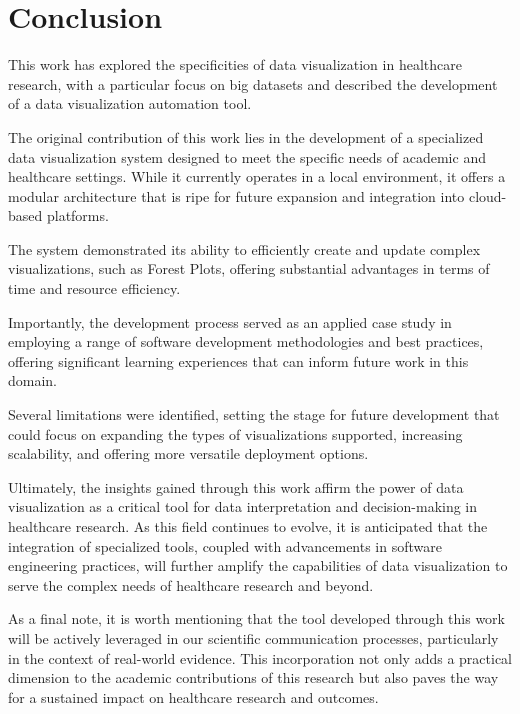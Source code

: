 \chapter{Conclusion}\label{conclusion}

This work has explored the specificities of data visualization in
healthcare research, with a particular focus on big datasets and
described the development of a data visualization automation tool.

The original contribution of this work lies in the development of a
specialized data visualization system designed to meet the specific
needs of academic and healthcare settings. While it currently operates
in a local environment, it offers a modular architecture that is ripe
for future expansion and integration into cloud-based platforms.

The system demonstrated its ability to efficiently create and update
complex visualizations, such as Forest Plots, offering substantial
advantages in terms of time and resource efficiency.

Importantly, the development process served as an applied case study in
employing a range of software development methodologies and best
practices, offering significant learning experiences that can inform
future work in this domain.

Several limitations were identified, setting the stage for future
development that could focus on expanding the types of visualizations
supported, increasing scalability, and offering more versatile
deployment options.

Ultimately, the insights gained through this work affirm the power of
data visualization as a critical tool for data interpretation and
decision-making in healthcare research. As this field continues to
evolve, it is anticipated that the integration of specialized tools,
coupled with advancements in software engineering practices, will
further amplify the capabilities of data visualization to serve the
complex needs of healthcare research and beyond.

As a final note, it is worth mentioning that the tool developed through
this work will be actively leveraged in our scientific communication
processes, particularly in the context of real-world evidence. This
incorporation not only adds a practical dimension to the academic
contributions of this research but also paves the way for a sustained
impact on healthcare research and outcomes.
